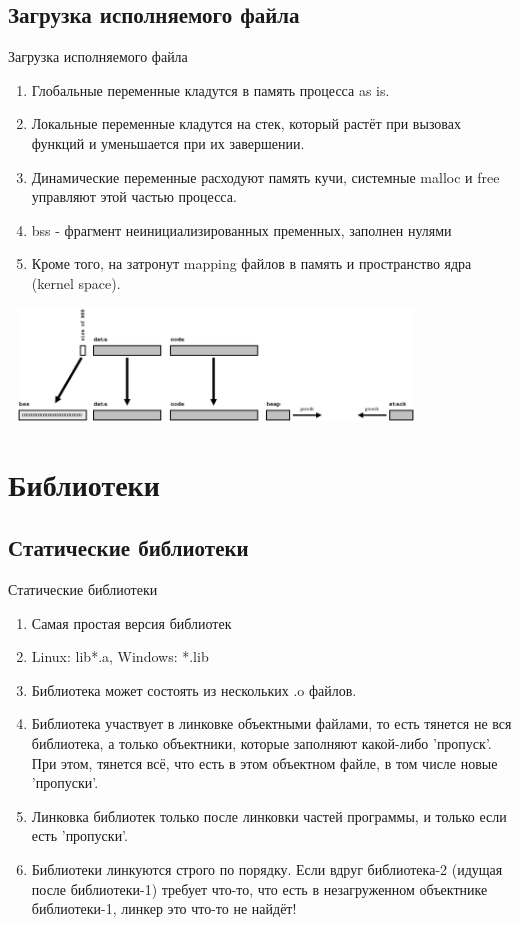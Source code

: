\documentclass[10pt]{beamer}
\begin{document}
\subsection{Загрузка исполняемого файла}
\begin{frame}{Загрузка исполняемого файла}
\begin{enumerate}
\item Глобальные переменные кладутся в память процесса as is.
\item Локальные переменные кладутся на стек, который растёт при вызовах функций и уменьшается при их завершении.
\item Динамические переменные расходуют память кучи, системные malloc и free управляют этой частью процесса.
\item bss - фрагмент неинициализированных пременных, заполнен нулями
\item Кроме того, на затронут mapping файлов в память и пространство ядра (kernel space).
\end{enumerate}
\includegraphics[width=11cm, height=3cm]{Term_3/Source/Pictures/os_map.png}
\end{frame}

\section{Библиотеки}
\subsection{Статические библиотеки}
\begin{frame}{Статические библиотеки}
\begin{enumerate}
\item Самая простая версия библиотек
\item Linux: lib*.a, Windows: *.lib
\item Библиотека может состоять из нескольких .o файлов.
\item Библиотека участвует в линковке объектными файлами, то есть тянется не вся библиотека, а только объектники, которые заполняют какой-либо 'пропуск'. При этом, тянется всё, что есть в этом объектном файле, в том числе новые 'пропуски'.
\item Линковка библиотек только после линковки частей программы, и только если есть 'пропуски'.
\item Библиотеки линкуются строго по порядку. Если вдруг библиотека-2 (идущая после библиотеки-1) требует что-то, что есть в незагруженном объектнике библиотеки-1, линкер это что-то не найдёт!

\end{enumerate}
\end{frame}
\end{document}

